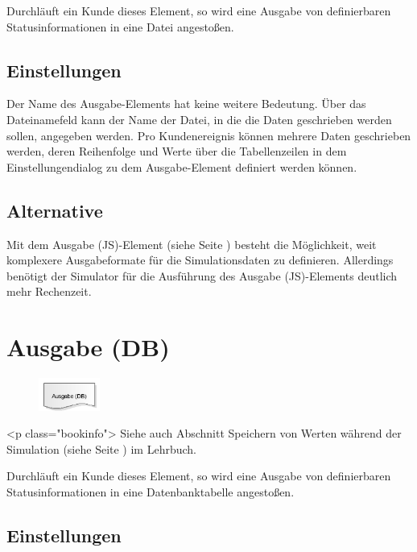 Durchläuft ein Kunde dieses Element, so wird eine Ausgabe von definierbaren Statusinformationen in eine
Datei angestoßen.

\subsection*{Einstellungen}

Der Name des Ausgabe-Elements hat keine weitere Bedeutung. Über das Dateinamefeld kann der Name der Datei,
in die die Daten geschrieben werden sollen, angegeben werden. Pro Kundenereignis können mehrere Daten
geschrieben werden, deren Reihenfolge und Werte über die Tabellenzeilen in dem Einstellungendialog zu
dem Ausgabe-Element definiert werden können.

\subsection*{Alternative}

Mit dem Ausgabe (JS)-Element (siehe Seite \pageref{ref:ModelElementOutputJS}) besteht die Möglichkeit, weit komplexere
Ausgabeformate für die Simulationsdaten zu definieren. Allerdings benötigt der Simulator für die Ausführung
des Ausgabe (JS)-Elements deutlich mehr Rechenzeit.


\section{Ausgabe (DB)}
\label{ref:ModelElementOutputDB}

\begin{figure}
\vspace{-22pt}
\includegraphics[width=2cm]{imageModelElementOutputDB.png}
\vspace{-22pt}
\end{figure}

<p class="bookinfo">
Siehe auch Abschnitt Speichern von Werten während der Simulation (siehe Seite \pageref{ref:book:9.3.3}) im Lehrbuch.

Durchläuft ein Kunde dieses Element, so wird eine Ausgabe von definierbaren Statusinformationen in eine
Datenbanktabelle angestoßen.

\subsection*{Einstellungen}

